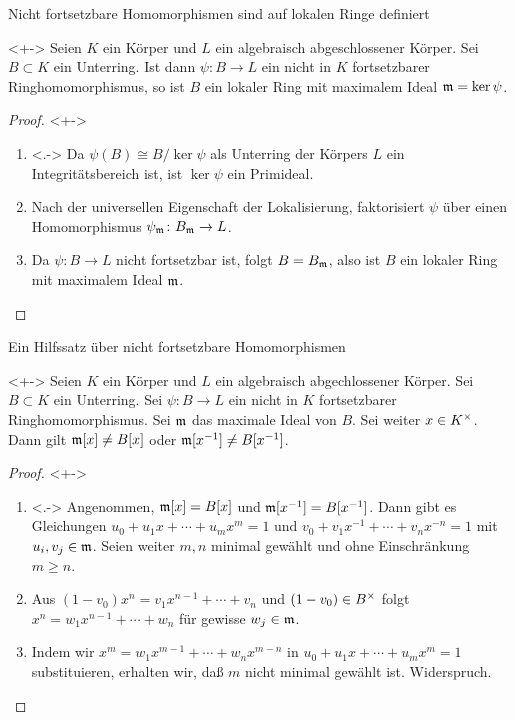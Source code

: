 \begin{frame}{Nicht fortsetzbare Homomorphismen sind auf lokalen Ringe definiert}
	\begin{lemma}<+->
		Seien \(K\) ein Körper und \(L\) ein algebraisch abgeschlossener Körper. Sei \(B
		\subset K\) ein	Unterring. Ist dann \(\psi\colon B \to L\) ein nicht
		in \(K\) fortsetzbarer Ringhomomorphismus, so ist \(B\) ein lokaler Ring mit
		maximalem Ideal \(\mathfrak{m} = \ker \psi\).
	\end{lemma}
	\begin{proof}<+->
		\begin{enumerate}[<+->]
		\item<.->
			Da \(\psi(B) \cong B/\ker \psi\) als Unterring der Körpers \(L\) ein
			Integritätsbereich ist, ist \(\ker \psi\) ein Primideal.
		\item
			Nach der universellen Eigenschaft der Lokalisierung, faktorisiert
			\(\psi\) über einen Homomorphismus \(\psi_{\mathfrak{m}}\colon
			B_{\mathfrak{m}} \to L\).
		\item
			Da \(\psi\colon B \to L\) nicht fortsetzbar ist, folgt
			\(B = B_{\mathfrak{m}}\), also ist \(B\) ein lokaler Ring mit maximalem
			Ideal \(\mathfrak{m}\).
			\qedhere
		\end{enumerate}
	\end{proof}
\end{frame}

\begin{frame}{Ein Hilfssatz über nicht fortsetzbare Homomorphismen}
	\begin{lemma}<+->
		Seien \(K\) ein Körper und \(L\) ein algebraisch abgechlossener
		Körper. Sei \(B \subset K\) ein Unterring.
		Sei \(\psi\colon B \to L\) ein nicht in \(K\) fortsetzbarer Ringhomomorphismus.
		Sei \(\mathfrak{m}\) das maximale Ideal von \(B\). Sei weiter
		\(x \in K^\times\). Dann gilt
		\(\mathfrak{m}[x] \neq B[x]\) oder \(\mathfrak{m}[x^{-1}] \neq B[x^{-1}]\).
	\end{lemma}
	\begin{proof}<+->
		\begin{enumerate}[<+->]
		\item<.->
			Angenommen, \(\mathfrak{m}[x] = B[x]\) und \(\mathfrak{m}[x^{-1}]
			= B[x^{-1}]\). Dann gibt es Gleichungen
			\(u_0 + u_1 x + \dotsb + u_m x^m = 1\) und
			\(v_0 + v_1 x^{-1} + \dotsb + v_n x^{-n} = 1\) mit \(u_i, v_j \in
			\mathfrak{m}\). Seien weiter \(m, n\) minimal gewählt und ohne
			Einschränkung \(m \ge n\).
		\item
			Aus \((1 - v_0) x^n = v_1 x^{n - 1} + \dotsb + v_n\) und
			\((1 - v_0) \in B^\times\) folgt
			\(x^n = w_1 x^{n - 1} + \dotsb + w_n\)
			für gewisse \(w_j \in \mathfrak{m}\).
		\item
			Indem wir \(x^m = w_1 x^{m - 1} + \dotsb + w_n x^{m - n}\) in
			\(u_0 + u_1 x + \dotsb + u_m x^m = 1\) substituieren, erhalten wir,
			daß \(m\) nicht minimal gewählt ist. Widerspruch.
			\qedhere
		\end{enumerate}
	\end{proof}
\end{frame}

